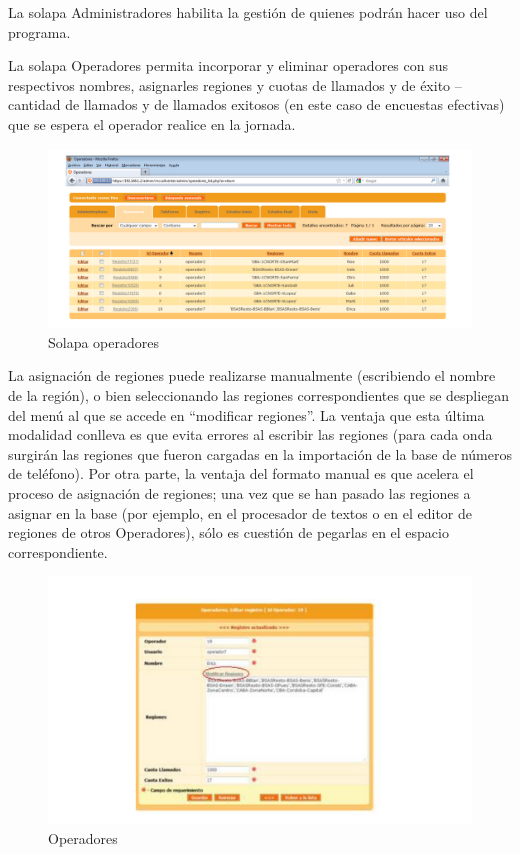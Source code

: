 \documentclass[
  openany]{book}
\begin{document}
La solapa Administradores habilita la gestión de quienes podrán hacer uso del programa.

La solapa Operadores permita incorporar y eliminar operadores con sus respectivos nombres, asignarles regiones y cuotas de llamados y de éxito -- cantidad de llamados y de llamados exitosos (en este caso de encuestas efectivas) que se espera el operador realice en la jornada.

\begin{figure}

{\centering \includegraphics[width=1\linewidth]{imagenes/figura6-03} 

}

\caption{Solapa operadores}\label{fig:Operadores}
\end{figure}

La asignación de regiones puede realizarse manualmente (escribiendo el nombre de la región), o bien seleccionando las regiones correspondientes que se despliegan del menú al que se accede en ``modificar regiones''. La ventaja que esta última modalidad conlleva es que evita errores al escribir las regiones (para cada onda surgirán las regiones que fueron cargadas en la importación de la base de números de teléfono). Por otra parte, la ventaja del formato manual es que acelera el proceso de asignación de regiones; una vez que se han pasado las regiones a asignar en la base (por ejemplo, en el procesador de textos o en el editor de regiones de otros Operadores), sólo es cuestión de pegarlas en el espacio correspondiente.

\begin{figure}

{\centering \includegraphics[width=1\linewidth]{imagenes/figura6-04} 

}

\caption{Operadores}\label{fig:Ope}
\end{figure}
\end{document}
